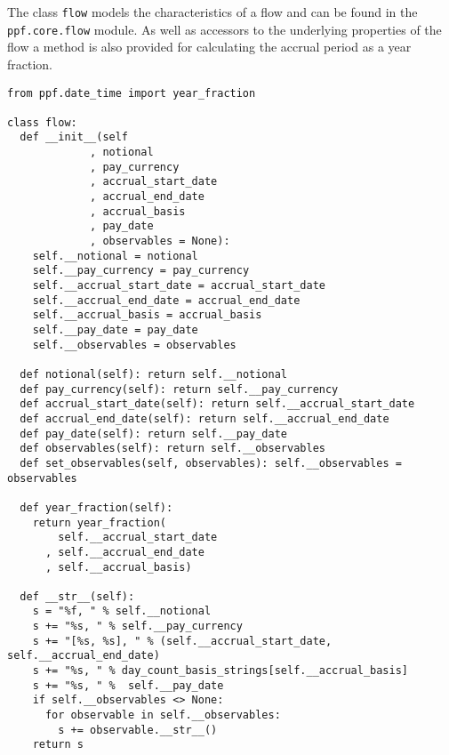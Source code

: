 The class \verb|flow| models the characteristics of a flow and can be
found in the \verb|ppf.core.flow| module. As well as accessors to the
underlying properties of the flow a method is also provided for
calculating the accrual period as a year fraction.
\begin{verbatim}
from ppf.date_time import year_fraction

class flow:
  def __init__(self
             , notional
             , pay_currency
             , accrual_start_date
             , accrual_end_date
             , accrual_basis
             , pay_date
             , observables = None):
    self.__notional = notional
    self.__pay_currency = pay_currency
    self.__accrual_start_date = accrual_start_date
    self.__accrual_end_date = accrual_end_date
    self.__accrual_basis = accrual_basis
    self.__pay_date = pay_date
    self.__observables = observables

  def notional(self): return self.__notional
  def pay_currency(self): return self.__pay_currency
  def accrual_start_date(self): return self.__accrual_start_date
  def accrual_end_date(self): return self.__accrual_end_date
  def pay_date(self): return self.__pay_date
  def observables(self): return self.__observables
  def set_observables(self, observables): self.__observables = observables

  def year_fraction(self):
    return year_fraction(
        self.__accrual_start_date
      , self.__accrual_end_date
      , self.__accrual_basis)

  def __str__(self):
    s = "%f, " % self.__notional
    s += "%s, " % self.__pay_currency
    s += "[%s, %s], " % (self.__accrual_start_date, self.__accrual_end_date)
    s += "%s, " % day_count_basis_strings[self.__accrual_basis]
    s += "%s, " %  self.__pay_date
    if self.__observables <> None:
      for observable in self.__observables:
        s += observable.__str__()
    return s
\end{verbatim}

